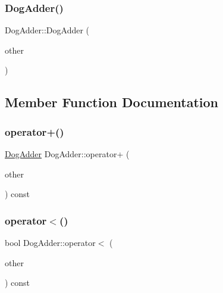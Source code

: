 \mbox{\label{classDogAdder_a35bb24b649b63f38784dcb44d55c4d94}} 
\subsubsection{\texorpdfstring{DogAdder()}{DogAdder()}\hspace{0.1cm}{\footnotesize\ttfamily [2/2]}}
{\footnotesize\ttfamily Dog\+Adder\+::\+Dog\+Adder (\begin{DoxyParamCaption}\item[{const \mbox{\hyperlink{classDogAdder}{Dog\+Adder}} \&}]{other }\end{DoxyParamCaption})\hspace{0.3cm}{\ttfamily [inline]}}



\subsection{Member Function Documentation}
\mbox{\label{classDogAdder_ad667166cdafb4352396e910faf09a55f}} 
\subsubsection{\texorpdfstring{operator+()}{operator+()}}
{\footnotesize\ttfamily \mbox{\hyperlink{classDogAdder}{Dog\+Adder}} Dog\+Adder\+::operator+ (\begin{DoxyParamCaption}\item[{const \mbox{\hyperlink{classDogAdder}{Dog\+Adder}} \&}]{other }\end{DoxyParamCaption}) const\hspace{0.3cm}{\ttfamily [inline]}}

\mbox{\label{classDogAdder_a6d87d3ee06c0167e7552ba83daa629e7}} 
\subsubsection{\texorpdfstring{operator$<$()}{operator<()}}
{\footnotesize\ttfamily bool Dog\+Adder\+::operator$<$ (\begin{DoxyParamCaption}\item[{const \mbox{\hyperlink{classDogAdder}{Dog\+Adder}} \&}]{other }\end{DoxyParamCaption}) const\hspace{0.3cm}{\ttfamily [inline]}}

